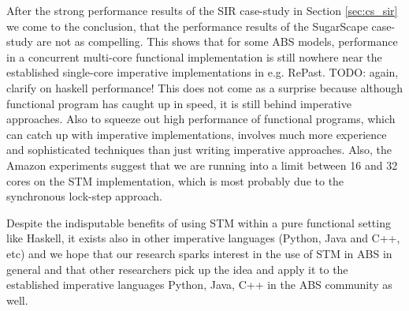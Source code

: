 After the strong performance results of the SIR case-study in Section \ref{sec:cs_sir} we come to the conclusion, that the performance results of the SugarScape case-study are not as compelling. This shows that for some ABS models, performance in a concurrent multi-core functional implementation is still nowhere near the established single-core imperative implementations in e.g. RePast. TODO: again, clarify on haskell performance! This does not come as a surprise because although functional program has caught up in speed, it is still behind imperative approaches. Also to squeeze out high performance of functional programs, which can catch up with imperative implementations, involves much more experience and sophisticated techniques than just writing imperative approaches.
Also, the Amazon experiments suggest that we are running into a limit between 16 and 32 cores on the STM implementation, which is most probably due to the synchronous lock-step approach.

Despite the indisputable benefits of using STM within a pure functional setting like Haskell, it exists also in other imperative languages (Python, Java and C++, etc) and we hope that our research sparks interest in the use of STM in ABS in general and that other researchers pick up the idea and apply it to the established imperative languages Python, Java, C++ in the ABS community as well.